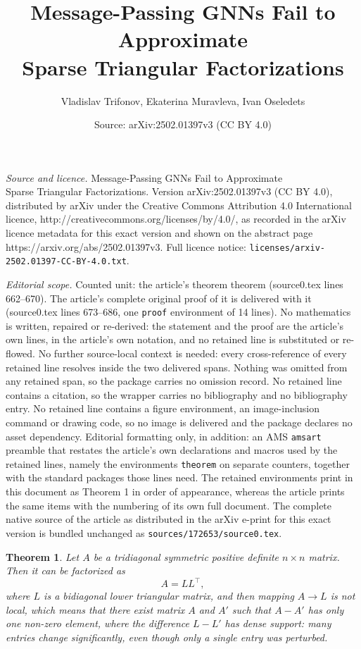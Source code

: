 \documentclass[10pt,a4paper]{amsart}
\title{Message-Passing GNNs Fail to Approximate \\ Sparse Triangular Factorizations}
\author{Vladislav Trifonov, Ekaterina Muravleva, Ivan Oseledets}
\date{Source: arXiv:2502.01397v3 (CC BY 4.0)}
\newtheorem{theorem}{Theorem}
\begin{document}
\maketitle

\noindent\emph{Source and licence.} Message-Passing GNNs Fail to Approximate \\ Sparse Triangular Factorizations. Version arXiv:2502.01397v3 (CC BY 4.0), distributed by arXiv under the Creative Commons Attribution 4.0 International licence, http://creativecommons.org/licenses/by/4.0/, as recorded in the arXiv licence metadata for this exact version and shown on the abstract page https://arxiv.org/abs/2502.01397v3. Full licence notice: \texttt{licenses/arxiv-2502.01397-CC-BY-4.0.txt}.\par\smallskip

\noindent\textit{Editorial scope.} Counted unit: the article's theorem theorem (source0.tex lines 662--670). The article's complete original proof of it is delivered with it (source0.tex lines 673--686, one \texttt{proof} environment of 14 lines). No mathematics is written, repaired or re-derived: the statement and the proof are the article's own lines, in the article's own notation, and no retained line is substituted or re-flowed.  No further source-local context is needed: every cross-reference of every retained line resolves inside the two delivered spans.  Nothing was omitted from any retained span, so the package carries no omission record.  No retained line contains a citation, so the wrapper carries no bibliography and no bibliography entry.  No retained line contains a figure environment, an image-inclusion command or drawing code, so no image is delivered and the package declares no asset dependency.  Editorial formatting only, in addition: an AMS \texttt{amsart} preamble that restates the article's own declarations and macros used by the retained lines, namely the environments \texttt{theorem} on separate counters, together with the standard packages those lines need.  The retained environments print in this document as Theorem 1 in order of appearance, whereas the article prints the same items with the numbering of its own full document.  The complete native source of the article as distributed in the arXiv e-print for this exact version is bundled unchanged as \texttt{sources/172653/source0.tex}.
\begin{theorem}
    Let $A$ be a tridiagonal symmetric positive definite $n \times n$ matrix. Then it can be factorized as
    \begin{equation*}
        A = LL^{\top},
    \end{equation*}
    where $L$ is a bidiagonal lower triangular matrix, and then mapping $A \rightarrow L$ is not local, which means 
    that there exist matrix $A$ and $A'$ such that $A-A'$ has only one non-zero element, where
    the difference $L - L'$ has dense support: many entries change significantly, even though only a single entry was perturbed.
\end{theorem}
\end{document}
